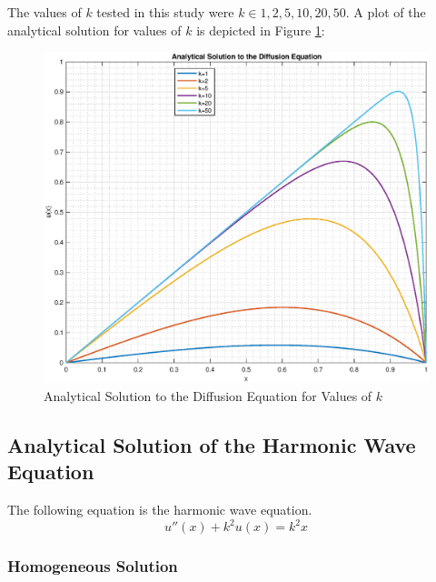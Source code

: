 \documentclass[10pt]{article}		%
\numberwithin{equation}{section}
\begin{document}
The values of $k$ tested in this study were $k \in {1, 2, 5, 10, 20, 50}$. A plot of the analytical solution for values of $k$ is depicted in Figure \ref{fig:analytical_diff}:
\begin{figure}[H]
	\begin{center}
		\includegraphics[width = 0.9\linewidth]{analytical_solution_diffusion}
		\caption{Analytical Solution to the Diffusion Equation for Values of $k$}
		\label{fig:analytical_diff}
	\end{center}
\end{figure}

\newpage

\subsection{Analytical Solution of the Harmonic Wave Equation}

The following equation is the harmonic wave equation.
\begin{equation}
u''(x)+k^2u(x)=k^2x
\end{equation}

\subsubsection{Homogeneous Solution}
\end{document}
